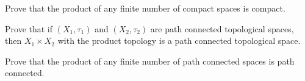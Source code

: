 \item \label{ex:compact_product} Prove that the product of any finite number of compact spaces is compact.

\begin{comment}

\ExerciseSolution Let $X_1$, $X_2$, $\ldots$, $X_n$ be compact topological spaces and let $X = \Pi_{i=1}^n X_i$. We proceed by induction on $n$. For $n=1$, the statement is trivial. The $n=2$ case is proved in Theorem \ref{thm:compact_product}. Assume that for any collection $\{X_i\}_{i=1}^k$ of compact spaces $X_i$ for some natural number $k$, the product $\Pi_{i=1}^k X_i$ is compact . Let $X_1$, $X_2$, $\ldots$, $X_k$, $X_{k+1}$ be compact spaces and let $X = \Pi_{i=1}^{k+1} X_i$. By our induction hypothesis, we know that $\Pi_{i=1}^k X_i$ is compact. Then, by Theorem \ref{thm:compact_product} we have that $X = \Pi_{i=1}^{k+1} X_i = \Pi_{i=1}^k X_i \times X_{k+1}$ is compact . We conclude that any finite product of compact spaces is compact. 

\end{comment}

\item \label{ex:path_connected_product}

\ba

\item Prove that if $(X_1, \tau_1)$ and $(X_2, \tau_2)$ are path connected topological spaces, then $X_1 \times X_2$ with the product topology is a path connected topological space.  

\item Prove that the product of any finite number of path connected spaces is path connected. 

\ea

